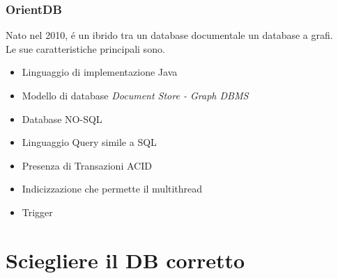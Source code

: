 \documentclass{beamer}
\begin{document}

\begin{frame}
\frametitle{OrientDB}
Nato nel 2010, \'e un ibrido tra un database documentale un database a grafi.\\
Le sue caratteristiche principali sono.
\begin{itemize}
\item Linguaggio di implementazione Java
\item Modello di database \emph{Document Store - Graph DBMS}
\item Database NO-SQL 
\item Linguaggio Query simile a SQL
\item Presenza di Transazioni ACID
\item Indicizzazione che permette il multithread
\item Trigger
\end{itemize}
\end{frame}

\section{Sciegliere il DB corretto}
\end{document}

